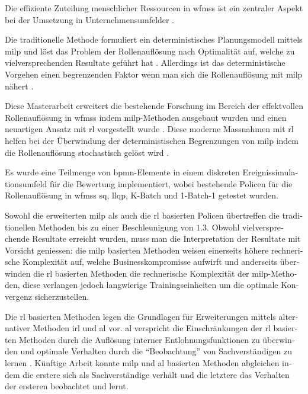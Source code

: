 \begin{otherlanguage}{ngerman}
	\begin{zusammenfassung}
	Die effiziente Zuteilung menschlicher Ressourcen in \glspl{wfms} ist ein zentraler Aspekt bei der Umsetzung in Unternehmensumfelder \citep{Cheng2000,Mentzas2001}.

	Die traditionelle Methode formuliert ein deterministisches Planungsmodell mittels \gls{milp} und löst das Problem der Rollenauflösung nach Optimalität auf, welche zu vielversprechenden Resultate geführt hat \citep{Zeng2005}. Allerdings ist das deterministische Vorgehen einen begrenzenden Faktor wenn man sich die Rollenauflösung mit \gls{milp} nähert \citep{Zeng2005}.

	Diese Masterarbeit erweitert die bestehende Forschung im Bereich der effektvollen Rollenauflösung in \glspl{wfms} indem \gls{milp}-Methoden ausgebaut wurden und einen neuartigen Ansatz mit \gls{rl} vorgestellt wurde \citep{Sutton2017}. Diese moderne Massnahmen mit \gls{rl} helfen bei der Überwindung der deterministischen Begrenzungen von \gls{milp} indem die Rollenauflösung stochastisch gelöst wird \citep{Sutton2017}.

	Es wurde eine Teilmenge von \gls{bpmn}-Elemente in einem diskreten Ereignissimulationsumfeld für die Bewertung implementiert, wobei bestehende Policen für die Rollenauflösung in \glspl{wfms} \zbg \gls{sq}, \gls{llqp}, K-Batch und 1-Batch-1 getestet wurden.

	Sowohl die erweiterten \gls{milp} als auch die \gls{rl} basierten Policen übertreffen die traditionellen Methoden bis zu einer Beschleunigung von $1.3$. Obwohl vielversprechende Resultate erreicht wurden, muss man die Interpretation der Resultate mit Vorsicht geniessen: die \gls{milp} basierten Methoden weisen einerseits höhere rechnerische Komplexität auf, welche Businesskompromisse aufwirft und anderseits überwinden die \gls{rl} basierten Methoden die rechnerische Komplexität der \gls{milp}-Methoden, diese verlangen jedoch langwierige Trainingseinheiten um die optimale Konvergenz sicherzustellen.

	Die \gls{rl} basierten Methoden legen die Grundlagen für Erweiterungen mittels alternativer Methoden \zbg \gls{irl} \citep{Ng2000} und \gls{al} \citep{Abbeel2004} vor. \gls{al} verspricht die Einschränkungen der \gls{rl} basierten Methoden durch die Auflösung interner Entlohnungsfunktionen zu überwinden und optimale Verhalten durch die ``Beobachtung'' von Sachverständigen zu lernen \citep{Abbeel2004}. Künftige Arbeit konnte \gls{milp} und \gls{al} basierten Methoden abgleichen indem die erstere sich als Sachverständige verhält und die letztere das Verhalten der ersteren beobachtet und lernt.
	\end{zusammenfassung}
\end{otherlanguage}